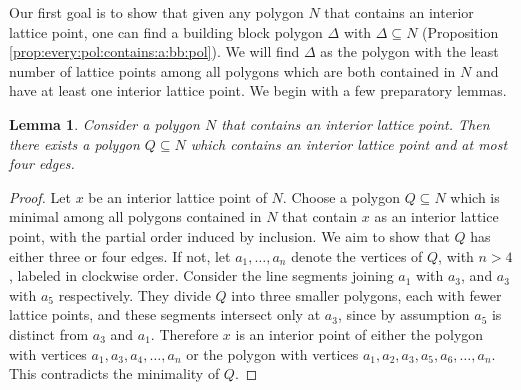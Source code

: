 \documentclass[11pt]{article} %
\newtheorem{lemma}[theorem]{Lemma}
\theoremstyle{definition}
\begin{document}
Our first goal is to show that given any polygon $N$ that contains an interior lattice point, one can find a building block polygon $\Delta$ with $\Delta \subseteq N$ (Proposition \ref{prop:every:pol:contains:a:bb:pol}). We will find $\Delta$ as the polygon with the least number of lattice points among all polygons which are both contained in $N$ and have at least one interior lattice point. We begin with a few preparatory lemmas.

\begin{lemma}\label{lemma:minimal:pol:has:up:to:4:edges}
Consider a polygon $N$ that contains an interior lattice point. Then there exists a polygon $Q\subseteq N$ which contains an interior lattice point and at most four edges.
\end{lemma}
\begin{proof}

Let $x$ be an interior lattice point of $N$. Choose a polygon $Q\subseteq N$ which is minimal among all polygons contained in $N$ that contain $x$ as an interior lattice point, with the partial order induced by inclusion. We aim to show that $Q$ has either three or four edges. If not, let $a_1,\dots,a_n$ denote the vertices of $Q$, with $n>4$, labeled in clockwise order.
Consider the line segments joining $a_1$ with $a_3$, and $a_3$ with $a_5$ respectively. They divide $Q$ into three smaller polygons, each with fewer lattice points, and these segments intersect only at $a_3$, since by assumption $a_5$ is distinct from $a_3$ and $a_1$. Therefore $x$ is an interior point of either the polygon with vertices $a_1,a_3,a_4,\dots,a_n$ or the polygon with vertices $a_1,a_2,a_3,a_5,a_6, \dots , a_n$. This contradicts the minimality of $Q$.\end{proof}
\end{document}
